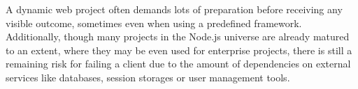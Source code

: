 A dynamic web project often demands lots of preparation before receiving any visible outcome, sometimes even when using a predefined framework. Additionally, though many projects in the Node.js universe are already matured to an extent, where they may be even used for enterprise projects, there is still a remaining risk for failing a client due to the amount of dependencies on external services like databases, session storages or user management tools.





